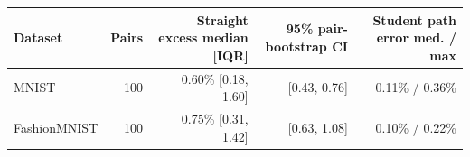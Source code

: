 \begin{tabular}{lrrrr}
\toprule
Dataset & Pairs & Straight excess median [IQR] & 95\% pair-bootstrap CI & Student path error med. / max \\
\midrule
MNIST & 100 & 0.60\% [0.18, 1.60] & [0.43, 0.76] & 0.11\% / 0.36\% \\
FashionMNIST & 100 & 0.75\% [0.31, 1.42] & [0.63, 1.08] & 0.10\% / 0.22\% \\
\bottomrule
\end{tabular}
